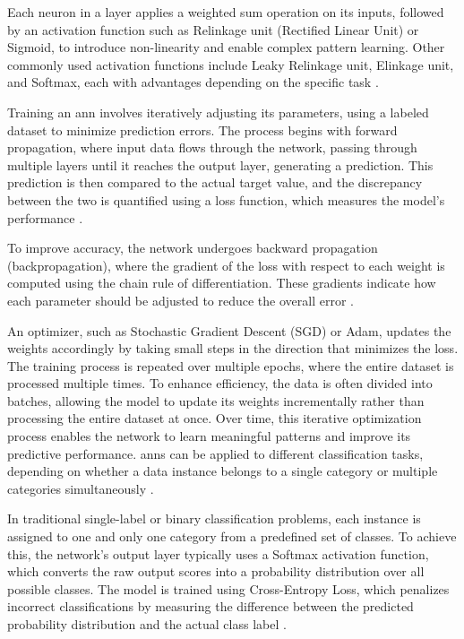 Each neuron in a layer applies a weighted sum operation on its inputs, followed by an activation function such as Relinkage unit (Rectified Linear Unit) or Sigmoid, to introduce non-linearity and enable complex pattern learning.
Other commonly used activation functions include Leaky Relinkage unit, Elinkage unit, and Softmax, each with advantages depending on the specific task \cite{sharma2017activation,russell2016artificial}.

Training an \ac{ann} involves iteratively adjusting its parameters, using a labeled dataset to minimize prediction errors.
The process begins with forward propagation, where input data flows through the network, passing through multiple layers until it reaches the output layer, generating a prediction.
This prediction is then compared to the actual target value, and the discrepancy between the two is quantified using a loss function, which measures the model's performance \cite{russell2016artificial}.

To improve accuracy, the network undergoes backward propagation (backpropagation), where the gradient of the loss with respect to each weight is computed using the chain rule of differentiation.
These gradients indicate how each parameter should be adjusted to reduce the overall error \cite{russell2016artificial}.

An optimizer, such as Stochastic Gradient Descent (SGD) or Adam, updates the weights accordingly by taking small steps in the direction that minimizes the loss.
The training process is repeated over multiple epochs, where the entire dataset is processed multiple times.
To enhance efficiency, the data is often divided into batches, allowing the model to update its weights incrementally rather than processing the entire dataset at once.
Over time, this iterative optimization process enables the network to learn meaningful patterns and improve its predictive performance.
\ac{ann}s can be applied to different classification tasks, depending on whether a data instance belongs to a single category or multiple categories simultaneously \cite{russell2016artificial}.

In traditional single-label or binary classification problems, each instance is assigned to one and only one category from a predefined set of classes.
To achieve this, the network's output layer typically uses a Softmax activation function, which converts the raw output scores into a probability distribution over all possible classes.
The model is trained using Cross-Entropy Loss, which penalizes incorrect classifications by measuring the difference between the predicted probability distribution and the actual class label \cite{russell2016artificial,herrera2016multilabel}.

